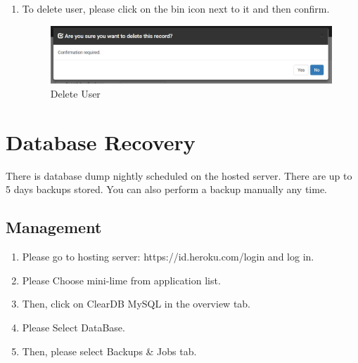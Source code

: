 \documentclass[a4paper,11pt,twoside]{report}
\theoremstyle{definition}
\begin{document}
\begin{enumerate}
\item To delete user, please click on the bin icon next to it and then confirm.


\begin{figure}[h!]
\begin{center}
\includegraphics[width=\textwidth]{AS/users/5}
\end{center}
\caption{Delete User}
\end{figure}
\thispagestyle{empty}


\end{enumerate}

\section{Database Recovery}

There is database dump nightly scheduled on the hosted server. There are up to 5 days backups stored. You can also perform a backup manually any time.
\subsection{Management}
\begin{enumerate}
\item Please go to hosting server: https://id.heroku.com/login and log in.
\item Please Choose mini-lime from application list.
\item Then, click on ClearDB MySQL in the overview tab.
\item Please Select DataBase.
\item Then, please select Backups \& Jobs tab.
 \end{enumerate}
\end{document}
